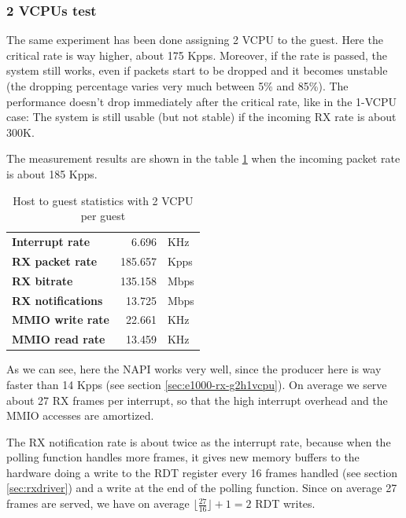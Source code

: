 \subsubsection{2 VCPUs test}
The same experiment has been done assigning 2 VCPU to the guest. Here the critical rate is way higher, about 175 Kpps. Moreover,
if the rate is passed, the system still works, even if packets start to be dropped and it becomes unstable (the dropping percentage
varies very much between 5\% and 85\%). The performance doesn't drop immediately after the critical rate, like in the 1-VCPU case: The system
is still usable (but not stable) if the incoming RX rate is about 300K.

The measurement results are shown in the table \ref{tab:e1000-rx-g2h2vcpu} when the incoming packet rate is about 185 Kpps.

\begin{table}
\begin{center}
\begin{tabular}{lrl}
\toprule
\textbf{Interrupt rate} & 6.696 & KHz\\
\textbf{RX packet rate} & 185.657 & Kpps\\
\textbf{RX bitrate} & 135.158 & Mbps\\
\textbf{RX notifications} & 13.725 & Mbps\\
\textbf{MMIO write rate} & 22.661 & KHz\\
\textbf{MMIO read rate} & 13.459 & KHz\\
\bottomrule
\end{tabular}
\end{center}
\caption[H2G with 2VCPU per guest]{Host to guest statistics with 2 VCPU per guest}
\label{tab:e1000-rx-g2h2vcpu}
\end{table}

As we can see, here the NAPI works very well, since the producer here is way faster than 14 Kpps (see section \ref{sec:e1000-rx-g2h1vcpu}).
On average we serve about 27 RX frames per interrupt, so that the high interrupt overhead and the MMIO accesses are amortized.

The RX notification rate is about twice as the interrupt rate, because when the polling function handles more frames, it gives new memory
buffers to the hardware doing a write to the RDT register every 16 frames handled (see section \ref{sec:rxdriver}) and a write at the end
of the polling function. Since on average 27 frames are served, we have on average $\lfloor \frac{27}{16} \rfloor + 1 = 2$ RDT writes.


